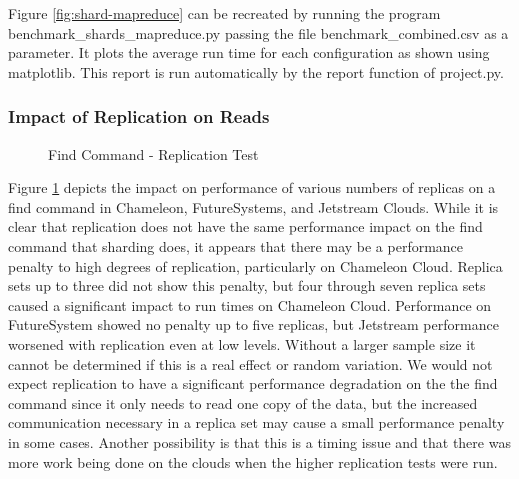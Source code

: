 \documentclass[9pt,twocolumn,twoside]{../../styles/osajnl}
\begin{document}
Figure \ref{fig:shard-mapreduce} can be recreated by running the program benchmark\_shards\_mapreduce.py passing the file benchmark\_combined.csv as a parameter.  It plots the average run time for each configuration as shown using matplotlib. This report is run automatically by the report function of project.py.

\subsubsection{Impact of Replication on Reads}


\begin{figure}[htbp]
\centering
{}
\caption{Find Command - Replication Test}
\label{fig:replica-find}
\end{figure}


Figure \ref{fig:replica-find} depicts the impact on performance of various numbers of replicas on a find command in Chameleon, FutureSystems, and Jetstream Clouds.  While it is clear that replication does not have the same performance impact on the find command that sharding does, it appears that there may be a performance penalty to high degrees of replication, particularly on Chameleon Cloud.  Replica sets up to three did not show this penalty, but four through seven replica sets caused a significant impact to run times on Chameleon Cloud.  Performance on FutureSystem showed no penalty up to five replicas, but Jetstream performance worsened with replication even at low levels.  Without a larger sample size it cannot be determined if this is a real effect or random variation.  We would not expect replication to have a significant performance degradation on the the find command since it only needs to read one copy of the data, but the increased communication necessary in a replica set may cause a small performance penalty in some cases.  Another possibility is that this is a timing issue and that there was more work being done on the clouds when the higher replication tests were run.
\end{document}
